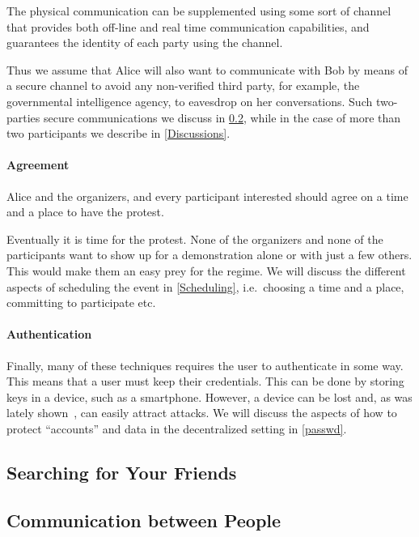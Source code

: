 The physical communication can be supplemented using some sort of channel that provides 
both off-line and real time communication capabilities, and guarantees the identity 
of each party using the channel.

Thus we assume that Alice will also want to communicate with Bob by means of a secure 
channel to avoid any non-verified third party, for example, the governmental intelligence 
agency, to eavesdrop on her conversations. Such two-parties secure communications 
we discuss in \cref{Communicating}, while in the case of more than two participants 
we describe in \cref{Discussions}.

\paragraph{Agreement}
Alice and the organizers, and every participant interested should agree on a 
time and a place to have the protest.

Eventually it is time for the protest.
None of the organizers and none of the participants want to show up for 
a demonstration alone or with just a few others.
This would make them an easy prey for the regime.
We will discuss the different aspects of scheduling the event in 
\cref{Scheduling}, i.e.\ choosing a time and a place, committing to participate 
etc.

\paragraph{Authentication}
Finally, many of these techniques requires the user to authenticate in some 
way.
This means that a user must keep their credentials.
This can be done by storing keys in a device, such as a smartphone.
However, a device can be lost and, as was lately shown~\cite{AppleVsFBI}, can 
easily attract attacks.
We will discuss the aspects of how to protect \enquote{accounts} and data in 
the decentralized setting in \cref{passwd}.

\subsection{Searching for Your Friends}
\label{UserSearch}





\subsection{Communication between People}
\label{Communicating}

